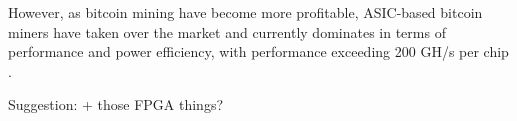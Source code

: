 However, as bitcoin mining have become more profitable, ASIC-based bitcoin miners have taken over
the market and currently dominates in terms of performance and power efficiency, with performance
exceeding 200 GH/s
per chip \cite{bespoke-silicon}.

Suggestion: + those FPGA things?
